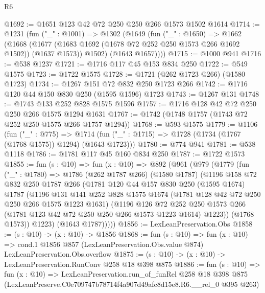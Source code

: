 \begin{lexlean}{R6}
\begin{coremodule}
@1692 := @1651 @123 @42 @72 @250 @250 @266 @1573 @1502 @1614
@1714 := @1231
    (fun ("_" : @1001) =>
    @1302
      (@1649
        (fun ("_" : @1650) =>
        @1662
          (@1668
            (@1677 (@1683 @1692 (@1678 @72 @252 @250 @1573 @266 @1692 @1502)) (@1637 @1573))
            @1502)
          (@1643 @1657))))
@1715 := @1000 @941
@1716 := @538 @1237
@1721 := @1716 @117 @45 @153 @834 @250
@1722 := @549 @1575
@1723 := @1722 @1575
@1728 := @1721 (@262 @1723 @266) (@1580 @1723)
@1734 := @1267 @151 @72 @832 @250 @1723 @266
@1742 := @1716 @120 @44 @150 @830 @250 (@1595 @1596) @1723
@1743 := @1267 @131
@1748 := @1743 @133 @252 @828 @1575 @1596
@1757 := @1716 @128 @42 @72 @250 @250 @266 @1575 @1294 @1631
@1767 := @1742 (@1748 @1757 (@1743 @72 @252 @250 @1575 @266 @1757 @1294))
@1768 := @593 @1575
@1779 := @1106
    (fun ("_" : @775) =>
    @1714 (fun ("_" : @1715) => @1728 (@1734 (@1767 (@1768 @1575)) @1294) (@1643 @1723)))
@1780 := @774 @941
@1781 := @538 @1118
@1786 := @1781 @117 @45 @160 @834 @250
@1787 := @1722 @1573
@1855 := fun (s : @10) =>
  fun (x : @10) =>
  @892
    (@961
      (@979
        (@1779
          (fun ("_" : @1780) =>
          @1786
            (@262 @1787 @266)
            (@1580 @1787)
            (@1196
              @158
              @72
              @832
              @250
              @1787
              @266
              (@1781
                @120
                @44
                @157
                @830
                @250
                (@1595 @1674)
                @1787
                (@1196
                  @131
                  @141
                  @252
                  @828
                  @1575
                  @1674
                  (@1781 @128 @42 @72 @250 @250 @266 @1575 @1223 @1631)
                  (@1196
                    @126
                    @72
                    @252
                    @250
                    @1573
                    @266
                    (@1781 @123 @42 @72 @250 @250 @266 @1573 @1223 @1614)
                    @1223))
                (@1768 @1573))
              @1223)
            (@1643 @1787)))))
@1856 := LexLeanPreservation.Obs
@1858 := (s : @10) -> (x : @10) -> @1856
@1868 := fun (s : @10) =>
  fun (x : @10) =>
  cond.{1} @1856 @857 (LexLeanPreservation.Obs.value @874) LexLeanPreservation.Obs.overflow
@1875 := (s : @10) -> (x : @10) -> LexLeanPreservation.RunConv @258 @18 @398 @875
@1886 := fun (s : @10) =>
  fun (x : @10) =>
  LexLeanPreservation.run_of_funRel
    @258
    @18
    @398
    @875
    (LexLeanPreserve.C0e709747b78714f4a907d49afc8d15e8.R6.__rel_0 @395 @263)
\end{coremodule}
\end{lexlean}
